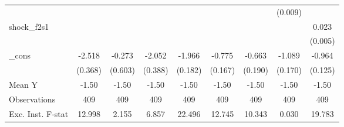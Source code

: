{\begin{tabular}{l*{8}{c}}
            &                     &                     &                     &                     &                     &                     &     (0.009)         &                     \\
\addlinespace
shock\_f2s1  &                     &                     &                     &                     &                     &                     &                     &       0.023\sym{***}\\
            &                     &                     &                     &                     &                     &                     &                     &     (0.005)         \\
\addlinespace
\_cons      &      -2.518\sym{***}&      -0.273         &      -2.052\sym{***}&      -1.966\sym{***}&      -0.775\sym{***}&      -0.663\sym{***}&      -1.089\sym{***}&      -0.964\sym{***}\\
            &     (0.368)         &     (0.603)         &     (0.388)         &     (0.182)         &     (0.167)         &     (0.190)         &     (0.170)         &     (0.125)         \\
\midrule
Mean Y      &       -1.50         &       -1.50         &       -1.50         &       -1.50         &       -1.50         &       -1.50         &       -1.50         &       -1.50         \\
Observations&         409         &         409         &         409         &         409         &         409         &         409         &         409         &         409         \\
Exc. Inst. F-stat&      12.998         &       2.155         &       6.857         &      22.496         &      12.745         &      10.343         &       0.030         &      19.783         \\
\bottomrule
\end{tabular}
}

